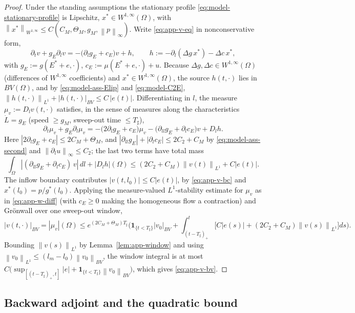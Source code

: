 \documentclass[pdflatex,sn-mathphys-num]{sn-jnl}
\theoremstyle{thmstyleone}
\theoremstyle{definition}
\theoremstyle{remark}
\newcommand{\Om}{\Omega}
\newcommand{\norm}[1]{\left\lVert#1\right\rVert}
\newcommand{\abs}[1]{\left\lvert#1\right\rvert}
\numberwithin{equation}{section}
\begin{document}
\begin{proof}
Under the standing assumptions the stationary profile
\eqref{eq:model-stationary-profile} is Lipschitz, $x^*\in W^{1,\infty}(\Om)$, with
$\norm{x^*}_{W^{1,\infty}}\le C(C_M,\Theta_M,g_M,\norm{p}_\infty)$. Write
\eqref{eq:app-v-eq} in nonconservative form,
\[
\partial_t v+g_E\partial_l v
=-\big(\partial_l g_E+c_E\big)v+h,
\qquad
h:=-\partial_l(\Delta g\,x^*)-\Delta c\,x^*,
\]
with $g_E:=g(E^*+e,\cdot)$, $c_E:=\mu(E^*+e,\cdot)+u$. Because
$\Delta g,\Delta c\in W^{1,\infty}(\Om)$ (differences of $W^{1,\infty}$
coefficients) and $x^*\in W^{1,\infty}(\Om)$, the source $h(t,\cdot)$ lies in
$BV(\Om)$, and by \eqref{eq:model-ass-Elip} and \eqref{eq:model-C2E},
$\displaystyle 
\norm{h(t,\cdot)}_{L^1}+\abs{h(t,\cdot)}_{BV}\le C\,\abs{e(t)}$.
Differentiating in $l$, the measure $\mu_v:=D_lv(t,\cdot)$ satisfies, in the sense
of measures along the characteristics $\dot L=g_E$ (speed $\ge g_M$, sweep-out
time $\le T_\sharp$),
\[
\partial_t\mu_v+g_E\partial_l\mu_v
=-\big(2\partial_l g_E+c_E\big)\mu_v
-\big(\partial_{ll}g_E+\partial_l c_E\big)v+D_lh .
\]
Here $\abs{2\partial_l g_E+c_E}\le 2C_M+\Theta_M$, and
$\abs{\partial_{ll}g_E}+\abs{\partial_l c_E}\le 2C_2+C_M$ by
\eqref{eq:model-ass-second} and $\norm{\partial_l u}_\infty\le C_2$; the last two
terms have total mass
\[
\int_\Om\abs{(\partial_{ll}g_E+\partial_l c_E)\,v}\,dl+\abs{D_lh}(\Om)
\le (2C_2+C_M)\norm{v(t)}_{L^1}+C\abs{e(t)} .
\]
The inflow boundary contributes $\abs{v(t,l_0)}\le C\abs{e(t)}$, by
\eqref{eq:app-v-bc} and $x^*(l_0)=p/g^*(l_0)$. Applying the measure-valued
$L^1$-stability estimate for $\mu_v$ as in \eqref{eq:app-w-diff} (with $c_E\ge0$
making the homogeneous flow a contraction) and Gr\"onwall over one sweep-out
window,
\[
\abs{v(t,\cdot)}_{BV}=\abs{\mu_v}(\Om)
\le e^{(2C_M+\Theta_M)T_\sharp}
\Big(\mathbf 1_{\{t<T_\sharp\}}\abs{v_0}_{BV}
+\!\!\int_{(t-T_\sharp)_+}^{t}\!\!\big[C\abs{e(s)}
+(2C_2+C_M)\norm{v(s)}_{L^1}\big]ds\Big).
\]
Bounding $\norm{v(s)}_{L^1}$ by Lemma~\ref{lem:app-window} and using
$\norm{v_0}_{L^1}\le(l_m-l_0)\norm{v_0}_{BV}$, the window integral is at most
$C\big(\sup_{[(t-T_\sharp)_+,t]}\abs{e}+\mathbf 1_{\{t<T_\sharp\}}\norm{v_0}_{BV}\big)$,
which gives \eqref{eq:app-v-bv}.
\end{proof}

\subsection{Backward adjoint and the quadratic bound}
\label{subsec:app-quadratic}
\end{document}
